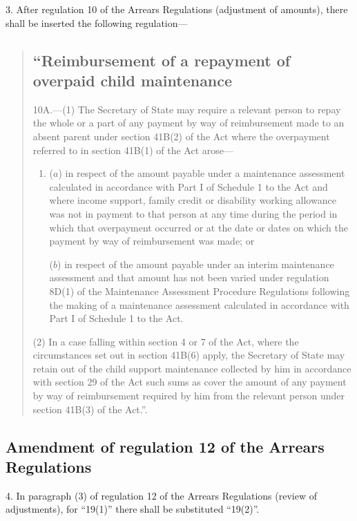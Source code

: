 \documentclass[a4paper]{article}
\begin{document}
3.  After regulation 10 of the Arrears Regulations (adjustment of amounts), there shall be inserted the following regulation—
\begin{quotation}
\subsection*{\sloppy “Reimbursement of a repayment of overpaid child maintenance}

10A.—(1) The Secretary of State may require a relevant person to repay the whole or a part of any payment by way of reimbursement made to an absent parent under section 41B(2) of the Act where the overpayment referred to in section 41B(1) of the Act arose—
\begin{enumerate}\item[]
($a$) in respect of the amount payable under a maintenance assessment calculated in accordance with Part I of Schedule 1 to the Act and where income support, family credit or disability working allowance was not in payment to that person at any time during the period in which that overpayment occurred or at the date or dates on which the payment by way of reimbursement was made; or

($b$) in respect of the amount payable under an interim maintenance assessment and that amount has not been varied under regulation 8D(1) of the Maintenance Assessment Procedure Regulations following the making of a maintenance assessment calculated in accordance with Part I of Schedule 1 to the Act.
\end{enumerate}

(2) In a case falling within section 4 or 7 of the Act, where the circumstances set out in section 41B(6) apply, the Secretary of State may retain out of the child support maintenance collected by him in accordance with section 29 of the Act such sums as cover the amount of any payment by way of reimbursement required by him from the relevant person under section 41B(3) of the Act.”.
\end{quotation}

\subsection[4. Amendment of regulation 12 of the Arrears Regulations]{Amendment of regulation 12 of the Arrears Regulations}

4.  In paragraph (3) of regulation 12 of the Arrears Regulations (review of adjustments), for “19(1)” there shall be substituted “19(2)”.
\end{document}
